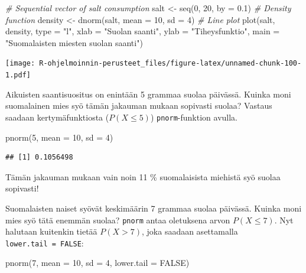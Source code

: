 \documentclass[
]{book}
\newenvironment{Shaded}{\begin{snugshade}}{\end{snugshade}}
\newcommand{\AttributeTok}[1]{\textcolor[rgb]{0.77,0.63,0.00}{#1}}
\newcommand{\CommentTok}[1]{\textcolor[rgb]{0.56,0.35,0.01}{\textit{#1}}}
\newcommand{\ConstantTok}[1]{\textcolor[rgb]{0.00,0.00,0.00}{#1}}
\newcommand{\DecValTok}[1]{\textcolor[rgb]{0.00,0.00,0.81}{#1}}
\newcommand{\FloatTok}[1]{\textcolor[rgb]{0.00,0.00,0.81}{#1}}
\newcommand{\FunctionTok}[1]{\textcolor[rgb]{0.00,0.00,0.00}{#1}}
\newcommand{\NormalTok}[1]{#1}
\newcommand{\OtherTok}[1]{\textcolor[rgb]{0.56,0.35,0.01}{#1}}
\newcommand{\StringTok}[1]{\textcolor[rgb]{0.31,0.60,0.02}{#1}}
\begin{document}
\begin{Shaded}
\begin{Highlighting}[]
\CommentTok{\# Sequential vector  of salt consumption}
\NormalTok{salt }\OtherTok{\textless{}{-}} \FunctionTok{seq}\NormalTok{(}\DecValTok{0}\NormalTok{, }\DecValTok{20}\NormalTok{, }\AttributeTok{by =} \FloatTok{0.1}\NormalTok{)}
\CommentTok{\# Density function}
\NormalTok{density }\OtherTok{\textless{}{-}} \FunctionTok{dnorm}\NormalTok{(salt, }\AttributeTok{mean =} \DecValTok{10}\NormalTok{, }\AttributeTok{sd =} \DecValTok{4}\NormalTok{)}
\CommentTok{\# Line plot}
\FunctionTok{plot}\NormalTok{(salt, density, }\AttributeTok{type =} \StringTok{"l"}\NormalTok{,}
     \AttributeTok{xlab =} \StringTok{"Suolan saanti"}\NormalTok{, }\AttributeTok{ylab =} \StringTok{"Tiheysfunktio"}\NormalTok{,}
     \AttributeTok{main =} \StringTok{"Suomalaisten miesten suolan saanti"}\NormalTok{)}
\end{Highlighting}
\end{Shaded}

\texttt{[image: R-ohjelmoinnin-perusteet\_files/figure-latex/unnamed-chunk-100-1.pdf]}

Aikuisten saantisuositus on enintään 5 grammaa suolaa päivässä. Kuinka moni suomalainen mies syö tämän jakauman mukaan sopivasti suolaa? Vastaus saadaan kertymäfunktiosta (\(P(X \leq 5)\)) \texttt{pnorm}-funktion avulla.

\begin{Shaded}
\begin{Highlighting}[]
\FunctionTok{pnorm}\NormalTok{(}\DecValTok{5}\NormalTok{, }\AttributeTok{mean =} \DecValTok{10}\NormalTok{, }\AttributeTok{sd =} \DecValTok{4}\NormalTok{)}
\end{Highlighting}
\end{Shaded}

\begin{verbatim}
## [1] 0.1056498
\end{verbatim}

Tämän jakauman mukaan vain noin 11 \% suomalaisista miehistä syö suolaa sopivasti!

Suomalaisten naiset syövät keskimäärin 7 grammaa suolaa päivässä. Kuinka moni mies syö tätä enemmän suolaa? \texttt{pnorm} antaa oletuksena arvon \(P(X \leq 7)\). Nyt halutaan kuitenkin tietää \(P(X > 7)\), joka saadaan asettamalla \texttt{lower.tail\ =\ FALSE}:

\begin{Shaded}
\begin{Highlighting}[]
\FunctionTok{pnorm}\NormalTok{(}\DecValTok{7}\NormalTok{, }\AttributeTok{mean =} \DecValTok{10}\NormalTok{, }\AttributeTok{sd =} \DecValTok{4}\NormalTok{, }\AttributeTok{lower.tail =} \ConstantTok{FALSE}\NormalTok{)}
\end{Highlighting}
\end{Shaded}
\end{document}
